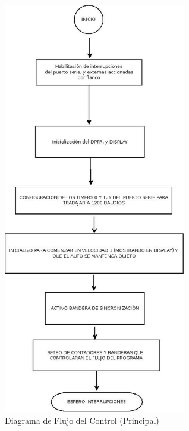 \documentclass[a4paper,10pt]{article}
\begin{document}
					\begin{figure}[!htb]
						\centering
						\includegraphics[width=8cm]{Imagenes/DiagFlujoControl4.jpg}
						\caption{Diagrama de Flujo del Control (Principal)} \label{ControlFlujo1}
					\end{figure}
\end{document}
